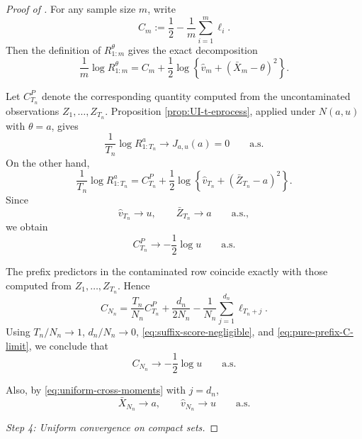 \documentclass[12pt]{article}
\theoremstyle{spaced}
\theoremstyle{remark}
\begin{document}
\begin{proof}[Proof of ]
For any sample size \(m\), write
\[
C_m
:=
\frac12-\frac1m\sum_{i=1}^m\ell_i.
\]
Then the definition of \(R_{1:m}^{\theta}\) gives the exact
decomposition
\begin{equation}
\label{eq:UI-cross-exact-decomp}
\frac1m\log R_{1:m}^{\theta}
=
C_m
+
\frac12
\log\left\{
\widehat v_m+(\bar X_m-\theta)^2
\right\}.
\end{equation}

Let \(C_{T_n}^{P}\) denote the corresponding quantity computed from
the uncontaminated observations \(Z_1,\ldots,Z_{T_n}\).  Proposition
\ref{prop:UI-t-eprocess}, applied under \(N(a,u)\) with \(\theta=a\),
gives
\[
\frac1{T_n}\log R_{1:T_n}^{a}
\longrightarrow
J_{a,u}(a)=0
\qquad\text{a.s.}
\]
On the other hand,
\[
\frac1{T_n}\log R_{1:T_n}^{a}
=
C_{T_n}^{P}
+
\frac12
\log\left\{
\widehat v_{T_n}
+
(\bar Z_{T_n}-a)^2
\right\}.
\]
Since
\[
\widehat v_{T_n}\longrightarrow u,
\qquad
\bar Z_{T_n}\longrightarrow a
\qquad\text{a.s.},
\]
we obtain
\begin{equation}
\label{eq:pure-prefix-C-limit}
C_{T_n}^{P}
\longrightarrow
-\frac12\log u
\qquad\text{a.s.}
\end{equation}

The prefix predictors in the contaminated row coincide exactly with
those computed from \(Z_1,\ldots,Z_{T_n}\).  Hence
\[
C_{N_n}
=
\frac{T_n}{N_n}C_{T_n}^{P}
+
\frac{d_n}{2N_n}
-
\frac1{N_n}
\sum_{j=1}^{d_n}\ell_{T_n+j}.
\]
Using \(T_n/N_n\to1\), \(d_n/N_n\to0\),
\eqref{eq:suffix-score-negligible}, and
\eqref{eq:pure-prefix-C-limit}, we conclude that
\begin{equation}
\label{eq:Cn-cross-limit}
C_{N_n}
\longrightarrow
-\frac12\log u
\qquad\text{a.s.}
\end{equation}

Also, by \eqref{eq:uniform-cross-moments} with \(j=d_n\),
\begin{equation}
\label{eq:full-cross-moment-limit}
\bar X_{N_n}\longrightarrow a,
\qquad
\widehat v_{N_n}\longrightarrow u
\qquad\text{a.s.}
\end{equation}

\medskip
\noindent
\textit{Step 4: Uniform convergence on compact sets.}


\end{proof}
\end{document}
